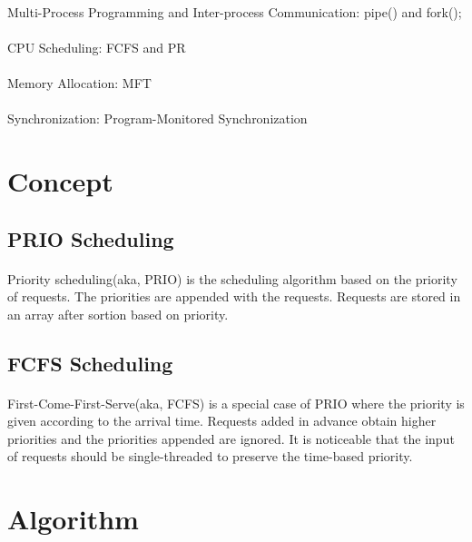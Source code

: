 \documentclass{article}
\begin{document}
        \paragraph{}
        Multi-Process Programming and Inter-process Communication: pipe() and fork(); 
        \paragraph{}
        CPU Scheduling: FCFS and PR 
        \paragraph{}
        Memory Allocation: MFT
        \paragraph{}
        Synchronization: Program-Monitored Synchronization 
    \cleardoublepage
    \section{Concept}
        \subsection{PRIO Scheduling}
            \paragraph{}
                Priority scheduling(aka, PRIO) is the scheduling algorithm based on the
                priority of requests. The priorities are appended with the requests. 
                Requests are stored in an array after sortion based on priority. 
        \subsection{FCFS Scheduling}
            \paragraph{}
                First-Come-First-Serve(aka, FCFS) is a special case of PRIO where the
                priority is given according to the arrival time. Requests added in 
                advance obtain higher priorities and the priorities appended are ignored.
                It is noticeable that the input of requests should be single-threaded to
                preserve the time-based priority.
    \cleardoublepage
    \section{Algorithm}
\end{document}
